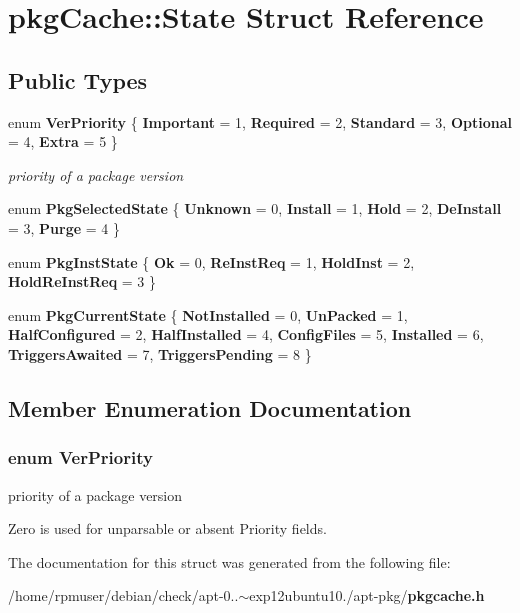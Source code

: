 \section{pkg\-Cache\-:\-:\-State \-Struct \-Reference}
\label{structpkgCache_1_1State}
\subsection*{\-Public \-Types}
\begin{DoxyCompactItemize}
\item 
enum {\bf \-Ver\-Priority} \{ \*
{\bfseries \-Important} = 1, 
{\bfseries \-Required} = 2, 
{\bfseries \-Standard} = 3, 
{\bfseries \-Optional} = 4, 
\*
{\bfseries \-Extra} = 5
 \}
\begin{DoxyCompactList}\small\item\em priority of a package version \end{DoxyCompactList}\item 
enum {\bfseries \-Pkg\-Selected\-State} \{ \*
{\bfseries \-Unknown} = 0, 
{\bfseries \-Install} = 1, 
{\bfseries \-Hold} = 2, 
{\bfseries \-De\-Install} = 3, 
\*
{\bfseries \-Purge} = 4
 \}
\item 
enum {\bfseries \-Pkg\-Inst\-State} \{ {\bfseries \-Ok} = 0, 
{\bfseries \-Re\-Inst\-Req} = 1, 
{\bfseries \-Hold\-Inst} = 2, 
{\bfseries \-Hold\-Re\-Inst\-Req} = 3
 \}
\item 
enum {\bfseries \-Pkg\-Current\-State} \{ \*
{\bfseries \-Not\-Installed} = 0, 
{\bfseries \-Un\-Packed} = 1, 
{\bfseries \-Half\-Configured} = 2, 
{\bfseries \-Half\-Installed} = 4, 
\*
{\bfseries \-Config\-Files} = 5, 
{\bfseries \-Installed} = 6, 
{\bfseries \-Triggers\-Awaited} = 7, 
{\bfseries \-Triggers\-Pending} = 8
 \}
\end{DoxyCompactItemize}


\subsection{\-Member \-Enumeration \-Documentation}
\subsubsection[{\-Ver\-Priority}]{\setlength{\rightskip}{0pt plus 5cm}enum {\bf \-Ver\-Priority}}\label{structpkgCache_1_1State_a2583b563902f3753ad4de31828b03773}


priority of a package version 

\-Zero is used for unparsable or absent \-Priority fields. 

\-The documentation for this struct was generated from the following file\-:\begin{DoxyCompactItemize}
\item 
/home/rpmuser/debian/check/apt-\/0..$\sim$exp12ubuntu10./apt-\/pkg/{\bf pkgcache.\-h}\end{DoxyCompactItemize}
